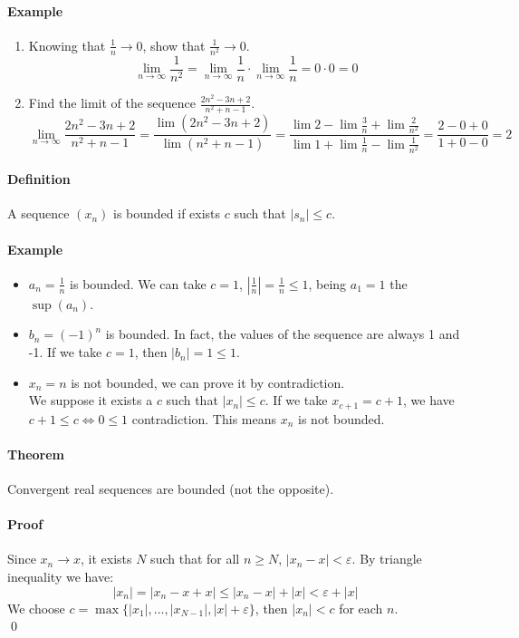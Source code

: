 \documentclass{article}
\newcommand{\abs}[1]{\left|#1\right|}
\newcommand{\limn}{\lim_{n \to \infty}}
\newcommand{\Ep}{\varepsilon}
\newcommand{\Def}{\paragraph{Definition}}
\newcommand{\Theorem}{\paragraph{Theorem}}
\newcommand{\Proof}{\paragraph{Proof}}
\newcommand{\Example}{\paragraph{Example}}
\begin{document}
	\Example
		\begin{enumerate}[label=(\arabic*)]
			\item
			Knowing that $\frac{1}{n} \to 0$, show that $\frac{1}{n^2} \to 0$.
			\begin{equation*}
				\limn \frac{1}{n^2} = \limn \frac{1}{n} \cdot \limn \frac{1}{n} = 0 \cdot 0 = 0
			\end{equation*}

			\item
			Find the limit of the sequence $\frac{2n^2 - 3n + 2}{n^2 + n -1}$.
			\begin{equation*}
				\limn \frac{2n^2 - 3n + 2}{n^2 + n -1} =
				\frac{\lim (2n^2 - 3n + 2)}{\lim (n^2 + n -1)} =
				\frac{\lim 2 - \lim \frac{3}{n} + \lim \frac{2}{n^2}}{\lim 1 +
				\lim \frac{1}{n} - \lim \frac{1}{n^2}} =
				\frac{2 - 0 + 0}{1 + 0 - 0} = 2
			\end{equation*}
		\end{enumerate}

	\Def A sequence $(x_n)$ is bounded if exists $c$ such that $\abs{s_n} \leq c$.

	\Example
	\begin{itemize}
		\item $a_n = \frac{1}{n}$ is bounded. We can take $c = 1$,
		$\abs{\frac{1}{n}} = \frac{1}{n} \leq 1$, being $a_1 = 1$ the $\sup(a_n)$.
		\item $b_n = (-1)^n$ is bounded. In fact, the values of the sequence are
		always 1 and -1. If we take $c = 1$, then $\abs{b_n} = 1 \leq 1$.
		\item $x_n = n$ is not bounded, we can prove it by contradiction.
	\\We suppose it exists a $c$ such that $\abs{x_n} \leq c$. If we take $x_{c+1}
		= c + 1$, we have $c + 1 \leq c \iff 0 \leq 1$ contradiction. This means
		$x_n$ is not bounded.
	\end{itemize}

	\Theorem Convergent real sequences are bounded (not the opposite).

	\Proof Since $x_n \to x$, it exists $N$ such that for all $n \geq N$,
	$\abs{x_n - x} < \Ep$. By triangle inequality we have:
	\begin{equation*}
		\abs{x_n} = \abs{x_n - x + x} \leq \abs{x_n - x} + \abs{x} < \Ep + \abs{x}
	\end{equation*}
	We choose $c = \max\{\abs{x_1}, \hdots, \abs{x_{N-1}}, \abs{x} + \Ep\}$,
	then $\abs{x_n} < c$ for each $n$.
\\\qed
\end{document}
